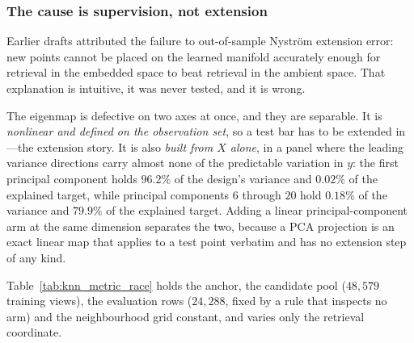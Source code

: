 \subsubsection{The cause is supervision, not extension}
\label{sec:knn_metric_race}

Earlier drafts attributed the failure to out-of-sample Nystr\"om extension
error: new points cannot be placed on the learned manifold accurately enough
for retrieval in the embedded space to beat retrieval in the ambient space.
That explanation is intuitive, it was never tested, and it is wrong.

The eigenmap is defective on two axes at once, and they are separable. It is
\emph{nonlinear and defined on the observation set}, so a test bar has to be
extended in---the extension story. It is also \emph{built from $X$ alone}, in a
panel where the leading variance directions carry almost none of the
predictable variation in $y$: the first principal component holds $96.2\%$ of
the design's variance and $0.02\%$ of the explained target, while principal
components $6$ through $20$ hold $0.18\%$ of the variance and $79.9\%$ of the
explained target. Adding a linear
principal-component arm at the same dimension separates the two, because a PCA
projection is an exact linear map that applies to a test point verbatim and has
no extension step of any kind.

Table~\ref{tab:knn_metric_race} holds the anchor, the candidate pool
($48{,}579$ training views), the evaluation rows ($24{,}288$, fixed by a rule
that inspects no arm) and the neighbourhood grid constant, and varies only the
retrieval coordinate.

